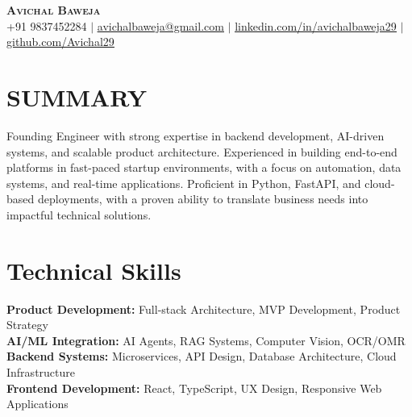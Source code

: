 \documentclass[letterpaper,10pt]{article}
\begin{document}
\begin{center}
    \textbf{\Huge \scshape Avichal Baweja} \\ \vspace{1pt}
    \small +91 9837452284 $|$ \href{mailto:avichalbaweja@gmail.com}{\underline{avichalbaweja@gmail.com}} $|$
    \href{https://www.linkedin.com/in/avichalbaweja29/}{\underline{linkedin.com/in/avichalbaweja29}} $|$
    \href{https://github.com/avichal29}{\underline{github.com/Avichal29}}
\end{center}

\section{SUMMARY}
Founding Engineer with strong expertise in backend development, AI-driven systems, and scalable product architecture. Experienced in building end-to-end platforms in fast-paced startup environments, with a focus on automation, data systems, and real-time applications. Proficient in Python, FastAPI, and cloud-based deployments, with a proven ability to translate business needs into impactful technical solutions.

\section{Technical Skills}
\begin{itemize}[leftmargin=0.2in, label={}]
    \small{\item{
    \textbf{Product Development:} Full-stack Architecture, MVP Development, Product Strategy \\
    \textbf{AI/ML Integration:} AI Agents, RAG Systems, Computer Vision, OCR/OMR \\
    \textbf{Backend Systems:} Microservices, API Design, Database Architecture, Cloud Infrastructure \\
    \textbf{Frontend Development:} React, TypeScript, UX Design, Responsive Web Applications \\
    }}
\end{itemize}
\end{document}
